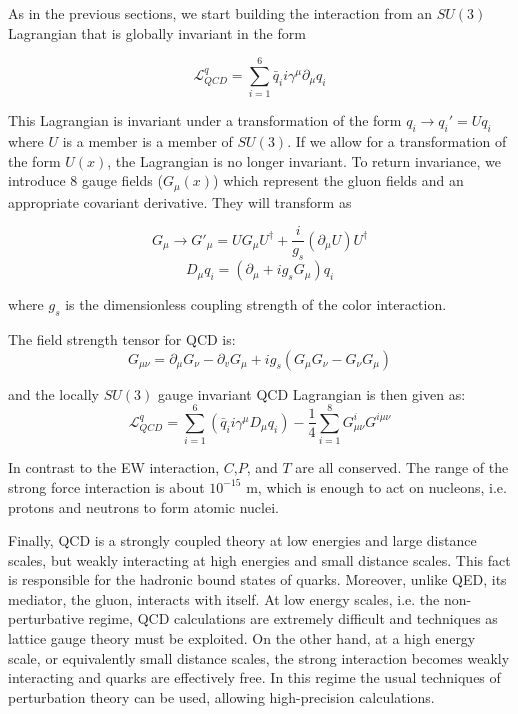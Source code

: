 As in the previous sections, we start building the interaction from an $SU(3)$ Lagrangian that is globally invariant in the form

	\begin{equation}
	\mathcal{L}^{q}_{QCD} = \sum_{i=1}^{6}\bar{q}_{i}i\gamma^{\mu}\partial_{\mu}q_{i}
	\end{equation}

This Lagrangian is invariant under a transformation of the form $q_{i}\rightarrow q_{i}' = Uq_{i}$ where $U$ is a member is a member of $SU(3)$. If we allow for a transformation of the form $U(x)$, the Lagrangian is no longer invariant. To return invariance, we introduce 8 gauge fields ($G_{\mu}(x)$) which represent the gluon fields and an appropriate covariant derivative. They will transform as
	
		\begin{equation}
		G_{\mu}\rightarrow G'_{\mu} = UG_{\mu}U^{\dagger}+\frac{i}{g_{s}}(\partial_{\mu}U)U^{\dagger}
		\end{equation}
		\begin{equation}
		D_{\mu}q_{i} = (\partial_{\mu}+ig_{s}G_{\mu})q_{i}
		\end{equation}
		
where $g_{s}$ is the dimensionless coupling strength of the color interaction.

The field strength tensor for QCD is:
		\begin{equation}
		G_{\mu\nu} = \partial_{\mu}G_{\nu} - \partial_{v}G_{\mu} + ig_{s}(G_{\mu}G_{\nu} - G_{\nu}G_{\mu})
		\end{equation}

and the locally $SU(3)$ gauge invariant QCD Lagrangian is then given as:
		\begin{equation}
		\mathcal{L}^{q}_{QCD} = \sum_{i=1}^{6}(\bar{q}_{i}i\gamma^{\mu}D_{\mu}q_{i})-\frac{1}{4}\sum_{i=1}^{8}G_{\mu\nu}^{i}G^{i\mu\nu}
		\end{equation}

In contrast to the EW interaction, $C$,$P$, and $T$ are all conserved. The range of the strong force interaction is about $10^{-15}$ m, which is enough to act on nucleons, i.e. protons and neutrons to form atomic nuclei.
	
Finally, QCD is a strongly coupled theory at low energies and large distance scales, but weakly interacting at high energies and small distance scales. This fact is responsible for the hadronic bound states of quarks. Moreover, unlike QED, its mediator, the gluon, interacts with itself.
At low energy scales, i.e. the non-perturbative regime, QCD calculations are extremely difficult and techniques as lattice gauge theory must be exploited.
On the other hand, at a high energy scale, or equivalently small distance scales, the strong interaction becomes weakly interacting and quarks are effectively free. In this regime the usual techniques of perturbation theory can be used, allowing high-precision calculations.

